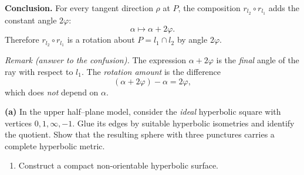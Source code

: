 \begin{solution}
\medskip
\noindent\textbf{Conclusion.}
For every tangent direction $\rho$ at $P$, the composition $r_{l_2}\circ r_{l_1}$
adds the constant angle $2\varphi$:
\[
\alpha \longmapsto \alpha+2\varphi.
\]
Therefore $r_{l_2}\circ r_{l_1}$ is a rotation about $P=l_1\cap l_2$ by angle $2\varphi$.

\medskip
\noindent\emph{Remark (answer to the confusion).}
The expression $\alpha+2\varphi$ is the \emph{final} angle of the ray with respect to $l_1$.
The \emph{rotation amount} is the difference
\[
(\alpha+2\varphi)-\alpha=2\varphi,
\]
which does \emph{not} depend on $\alpha$.

\end{solution}

\begin{problem}
\label{prob:cp-vii-0089}
\noindent\textbf{(a)} In the upper half--plane model, consider the
\emph{ideal} hyperbolic square with vertices \(0,1,\infty,-1\). Glue its edges
by suitable hyperbolic isometries and identify the quotient. Show that the
resulting sphere with three punctures carries a complete hyperbolic metric.

\begin{enumerate}
\item[(b)] Construct a compact non-orientable hyperbolic surface.
\end{enumerate}
\end{problem}

